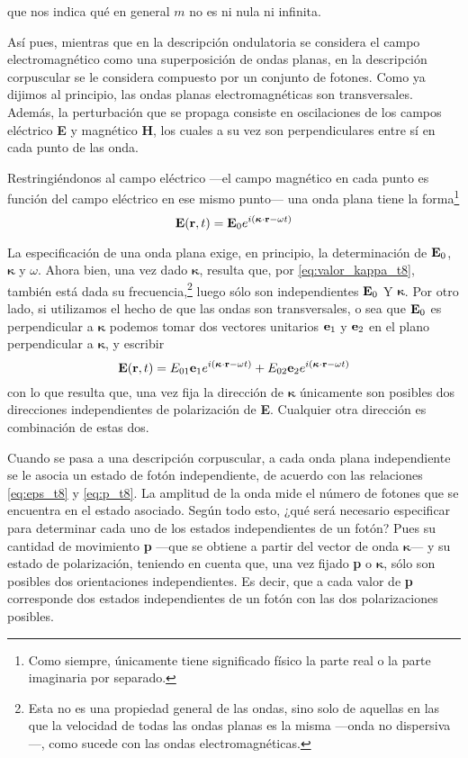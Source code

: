 que nos indica qué en general $m$ no es ni nula ni infinita.

Así pues, mientras que en la descripción ondulatoria se considera el campo electromagnético como una superposición de ondas planas, en la descripción corpuscular se le considera compuesto por un conjunto de fotones.
Como ya dijimos al principio, las ondas planas electromagnéticas son transversales.
Además, la perturbación que se propaga consiste en oscilaciones de los campos eléctrico \textbf{E} y magnético \textbf{H}, los cuales a su vez son perpendiculares entre sí en cada punto de las onda.

Restringiéndonos al campo eléctrico ---el campo magnético en cada punto es función del campo eléctrico en ese mismo punto--- una onda plana tiene la forma\footnote{Como siempre, únicamente tiene significado físico la parte real o la parte imaginaria por separado.}
\begin{equation}
	\vb{E}(\vb{r}, t) = \vb{E}_0 e^{i(\bm{\kappa}\cdot\vb{r}-\omega t)}
\end{equation}

La especificación de una onda plana exige, en principio, la determinación de $\vb{E}_0$, $\bm{\kappa}$ y $\omega$.
Ahora bien, una vez dado $\bm{\kappa}$, resulta que, por \eqref{eq:valor_kappa_t8}, también está dada su frecuencia,\footnote{ Esta no es una propiedad general de las ondas, sino solo de aquellas en las que la velocidad de todas las ondas planas es la misma ---onda no dispersiva---, como sucede con las ondas electromagnéticas.} luego sólo son independientes $\vb{E}_0$ Y $\bm{\kappa}$.
Por otro lado, si utilizamos el hecho de que las ondas son transversales, o sea que $\vb{E}_0$ es perpendicular a $\bm{\kappa}$ podemos tomar dos vectores unitarios $\vb{e}_1$ y $\vb{e}_2$ en el plano perpendicular a $\bm{\kappa}$, y escribir
\begin{equation}
	\vb{E}(\vb{r}, t) = E_{01} \vb{e}_1 e^{i(\bm{\kappa}\cdot\vb{r}-\omega t)} + E_{02} \vb{e}_2 e^{i(\bm{\kappa}\cdot\vb{r}-\omega t)}
\end{equation}
con lo que resulta que, una vez fija la dirección de $\bm{\kappa}$ únicamente son posibles dos direcciones independientes de polarización de \textbf{E}. Cualquier otra dirección es combinación de estas dos.

Cuando se pasa a una descripción corpuscular, a cada onda plana independiente se le asocia un estado de fotón independiente, de acuerdo con las relaciones \eqref{eq:eps_t8} y \eqref{eq:p_t8}.
La amplitud de la onda mide el número de fotones que se encuentra en el estado asociado.
Según todo esto, ¿qué será necesario especificar para determinar cada uno de los estados independientes de un fotón?
Pues su cantidad de movimiento \textbf{p} ---que se obtiene a partir del vector de onda $\bm{\kappa}$--- y su estado de polarización, teniendo en cuenta que, una vez fijado \textbf{p} o $\bm{\kappa}$, sólo son posibles dos orientaciones independientes.
Es decir, que a cada valor de \textbf{p} corresponde dos estados independientes de un fotón con las dos polarizaciones posibles.

